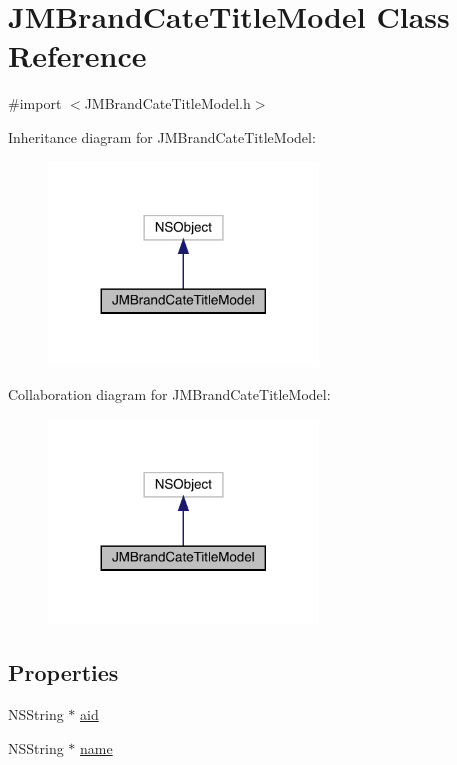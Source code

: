 \hypertarget{interface_j_m_brand_cate_title_model}{}\section{J\+M\+Brand\+Cate\+Title\+Model Class Reference}
\label{interface_j_m_brand_cate_title_model}


{\ttfamily \#import $<$J\+M\+Brand\+Cate\+Title\+Model.\+h$>$}



Inheritance diagram for J\+M\+Brand\+Cate\+Title\+Model\+:\nopagebreak
\begin{figure}[H]
\begin{center}
\leavevmode
\includegraphics[width=203pt]{interface_j_m_brand_cate_title_model__inherit__graph}
\end{center}
\end{figure}


Collaboration diagram for J\+M\+Brand\+Cate\+Title\+Model\+:\nopagebreak
\begin{figure}[H]
\begin{center}
\leavevmode
\includegraphics[width=203pt]{interface_j_m_brand_cate_title_model__coll__graph}
\end{center}
\end{figure}
\subsection*{Properties}
\begin{DoxyCompactItemize}
\item 
N\+S\+String $\ast$ \mbox{\hyperlink{interface_j_m_brand_cate_title_model_aa065be53ecd31387ebd8ca2b4f03534f}{aid}}
\item 
N\+S\+String $\ast$ \mbox{\hyperlink{interface_j_m_brand_cate_title_model_a8266b9927986cc2b6b956c506a822bae}{name}}
\end{DoxyCompactItemize}


